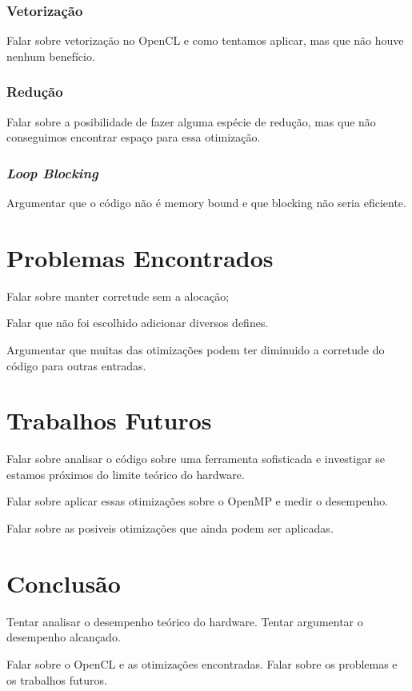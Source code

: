 \documentclass[12pt]{article}
\begin{document}
\subsubsection{Vetorização}

Falar sobre vetorização no OpenCL e como tentamos aplicar, mas que não houve nenhum benefício.

\subsubsection{Redução}

Falar sobre a posibilidade de fazer alguma espécie de redução, mas que não conseguimos encontrar espaço para essa otimização.

\subsubsection{\textit{Loop Blocking}}

Argumentar que o código não é memory bound e que blocking não seria eficiente.

\section{Problemas Encontrados}

Falar sobre manter corretude sem a alocação;

Falar que não foi escolhido adicionar diversos defines.

Argumentar que muitas das otimizações podem ter diminuido a corretude do código para outras entradas.

\section{Trabalhos Futuros}

Falar sobre analisar o código sobre uma ferramenta sofisticada e investigar se estamos próximos do limite teórico do hardware.

Falar sobre aplicar essas otimizações sobre o OpenMP e medir o desempenho.

Falar sobre as posiveis otimizações que ainda podem ser aplicadas.

\section{Conclusão}

Tentar analisar o desempenho teórico do hardware. Tentar argumentar o desempenho alcançado.

Falar sobre o OpenCL e as otimizações encontradas. Falar sobre os problemas e os trabalhos futuros.



\end{document}
